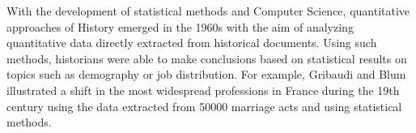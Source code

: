 


With the development of statistical methods and Computer Science, quantitative approaches of History emerged in the 1960s with the aim of analyzing quantitative data directly extracted from historical documents.
Using such methods, historians were able to make conclusions based on statistical results on topics such as demography \cite{henryRegistresParoissiauxHistoire1956} or job distribution.
For example, Gribaudi and Blum illustrated a shift in the most widespread professions in France during the 19th century using the data extracted from 50000 marriage acts \cite{gribaudi1990} and using statistical methods.

